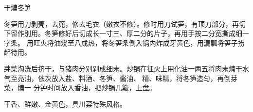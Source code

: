 %
%
%
%
%
%
%
\begin{recipe}{干煸冬笋}

\ingredients


\preparation

\step 冬笋用刀剥壳，去篼，修去毛衣（嫩衣不修）。修时用刀试笋，有顶刀部分，再切
下留作别用。冬笋修好后切成长一寸三、厚二分的片子，再用手按二分宽撕成细一字条。
用旺火将油烧至八成热，将冬笋条倒入锅内炸成牙黄色，用漏瓢将笋子捞起待用。

\step 芽菜淘洗后挤干，与猪肉分别剁成细末。炒锅在征火上用化油一两五将肉末煵干水
气至亮油，依次放入盐、料酒、冬笋、酱油、𰪿糟、味精，将冬笋造匀，再倒芽菜，煸一
分钟时间放入香油，把炒锅几簸，上盘。

\features

干香、鲜嫩、金黄色，具川菜特殊风格。

\end{recipe}

